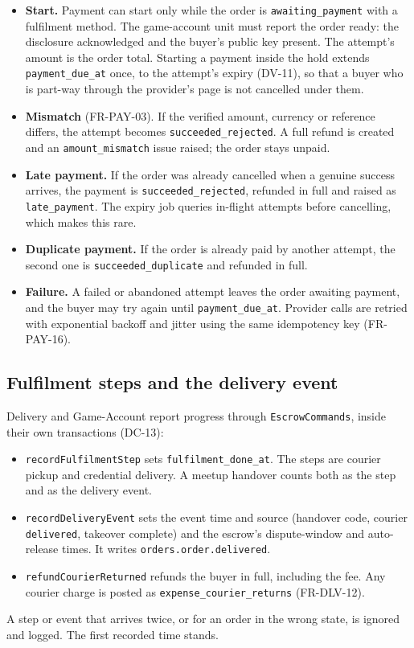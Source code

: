 \documentclass[11pt,a4paper]{article}
\begin{document}
\begin{itemize}[nosep]
  \item \textbf{Start.} Payment can start only while the order is \texttt{awaiting\_payment} with a fulfilment method. The game-account unit must report the order ready: the disclosure acknowledged and the buyer's public key present. The attempt's amount is the order total. Starting a payment inside the hold extends \texttt{payment\_due\_at} once, to the attempt's expiry (DV-11), so that a buyer who is part-way through the provider's page is not cancelled under them.
  \item \textbf{Mismatch} (FR-PAY-03). If the verified amount, currency or reference differs, the attempt becomes \texttt{succeeded\_rejected}. A full refund is created and an \texttt{amount\_mismatch} issue raised; the order stays unpaid.
  \item \textbf{Late payment.} If the order was already cancelled when a genuine success arrives, the payment is \texttt{succeeded\_rejected}, refunded in full and raised as \texttt{late\_payment}. The expiry job queries in-flight attempts before cancelling, which makes this rare.
  \item \textbf{Duplicate payment.} If the order is already paid by another attempt, the second one is \texttt{succeeded\_duplicate} and refunded in full.
  \item \textbf{Failure.} A failed or abandoned attempt leaves the order awaiting payment, and the buyer may try again until \texttt{payment\_due\_at}. Provider calls are retried with exponential backoff and jitter using the same idempotency key (FR-PAY-16).
\end{itemize}

\subsection{Fulfilment steps and the delivery event}
\label{sec:steps}
Delivery and Game-Account report progress through \texttt{EscrowCommands}, inside their own transactions (DC-13):
\begin{itemize}[nosep]
  \item \texttt{recordFulfilmentStep} sets \texttt{fulfilment\_done\_at}. The steps are courier pickup and credential delivery. A meetup handover counts both as the step and as the delivery event.
  \item \texttt{recordDeliveryEvent} sets the event time and source (handover code, courier \texttt{delivered}, takeover complete) and the escrow's dispute-window and auto-release times. It writes \texttt{orders.order.delivered}.
  \item \texttt{refundCourierReturned} refunds the buyer in full, including the fee. Any courier charge is posted as \texttt{expense\_courier\_returns} (FR-DLV-12).
\end{itemize}
A step or event that arrives twice, or for an order in the wrong state, is ignored and logged. The first recorded time stands.
\end{document}
